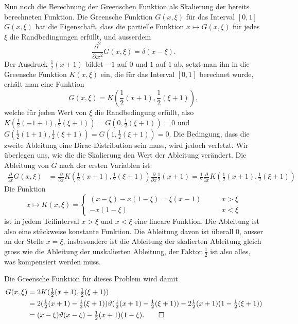 \begin{loesung}
Nun noch die Berechnung der Greenschen Funktion als Skalierung
der bereits berechneten Funktion. Die Greensche Funktion $G(x,\xi)$ für
das Interval $[0,1]$
$G(x,\xi)$ hat die Eigenschaft, dass die partielle Funktion
$x\mapsto G(x,\xi)$ für jedes $\xi$ die Randbedingungen erfüllt,
und ausserdem
\[
\frac{\partial^2}{\partial x^2}G(x,\xi)=\delta(x-\xi).
\]
Der Ausdruck $\frac12(x+1)$ bildet $-1$ auf $0$ und $1$ auf $1$
ab, setzt man ihn in die Greensche Funktion $K(x,\xi)$ ein,
die für das Interval $[0,1]$ berechnet wurde,
erhält man eine Funktion
\[
G(x,\xi)=K({\textstyle\frac12}(x+1),{\textstyle\frac12}(\xi+1)),
\]
welche
für jeden Wert von $\xi$ die Randbedingung erfüllt, also
$K(\frac12(-1+1),\frac12(\xi+1))=G(0,\frac12(\xi+1))=0$ und
$G(\frac12(1+1),\frac12(\xi+1))=G(1,\frac12(\xi+1))=0$.
Die Bedingung, dass die zweite Ableitung eine Dirac-Distribution
sein muss, wird jedoch verletzt. Wir überlegen uns, wie die
die Skalierung den Wert der Ableitung verändert.
Die Ableitung von $G$ nach der ersten Variablen ist:
\begin{align*}
\frac{\partial}{\partial x}G(x,\xi)
&=
\frac{\partial}{\partial x}K({\textstyle\frac12}(x+1),{\textstyle\frac12}(\xi+1))\frac{\partial}{\partial x}\frac12(x+1)
=
\frac12\frac{\partial }{\partial x}K({\textstyle \frac12}(x+1), {\textstyle\frac12}(\xi+1))
\end{align*}
Die Funktion
\[
x\mapsto K(x,\xi)=\begin{cases}
(x-\xi)-x(1-\xi)=\xi(x-1)&\qquad x>\xi
\\
-x(1-\xi)&\qquad x<\xi
\end{cases}
\]
ist in jedem Teilinterval $x>\xi$ und $x<\xi$ eine lineare Funktion. Die Ableitung
ist also eine stückweise konstante Funktion.
Die Ableitung davon ist überall $0$, ausser an der Stelle $x=\xi$,
insbesondere ist die Ableitung der skalierten Ableitung gleich gross
wie die Ableitung der unskalierten Ableitung, der Faktor $\frac12$ ist
also alles, was kompensiert werden muss.

Die Greensche Funktion für dieses Problem wird damit
\begin{align*}
G(x,\xi)&=
2K({\textstyle\frac12}(x+1),{\textstyle\frac12}(\xi+1))
\\
&=
2
({\textstyle\frac12}(x+1)-\textstyle{\frac12}(\xi+1))
\vartheta({\textstyle\frac12}(x+1)-{\textstyle\frac12}(\xi+1))
-2{\textstyle\frac12}(x+1)(1-{\textstyle\frac12}(\xi+1))
\\
&=
(x-\xi)\vartheta(x-\xi)-{\textstyle\frac12}(x+1)(1-\xi).
\qedhere
\end{align*}
\end{loesung}
